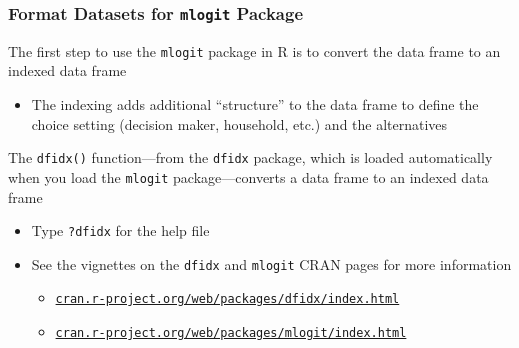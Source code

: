 \documentclass{beamer}\usepackage[]{graphicx}\usepackage[]{color}
\begin{document}
\begin{frame}\frametitle{Format Datasets for \texttt{mlogit} Package}
    The first step to use the \texttt{mlogit} package in R is to convert the data frame to an indexed data frame
    \begin{itemize}
    	\item The indexing adds additional ``structure'' to the data frame to define the choice setting (decision maker, household, etc.) and the alternatives
    \end{itemize}
    \vspace{2ex}
    The \texttt{dfidx()} function---from the \texttt{dfidx} package, which is loaded automatically when you load the \texttt{mlogit} package---converts a data frame to an indexed data frame
    \begin{itemize}
    	\item Type \texttt{?dfidx} for the help file
    	\item See the vignettes on the \texttt{dfidx} and \texttt{mlogit} CRAN pages for more information
    	\begin{itemize}
    		\item \href{https://cran.r-project.org/web/packages/dfidx/index.html}{\texttt{cran.r-project.org/web/packages/dfidx/index.html}}
    		\item \href{https://cran.r-project.org/web/packages/mlogit/index.html}{\texttt{cran.r-project.org/web/packages/mlogit/index.html}}
    	\end{itemize}
    \end{itemize}
\end{frame}
\end{document}
